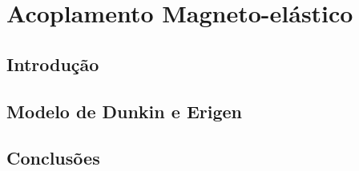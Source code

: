 \chapter{Acoplamento Magneto-elástico}

\section{Introdução}

\section{Modelo de Dunkin e Erigen}

\section{Conclusões}
